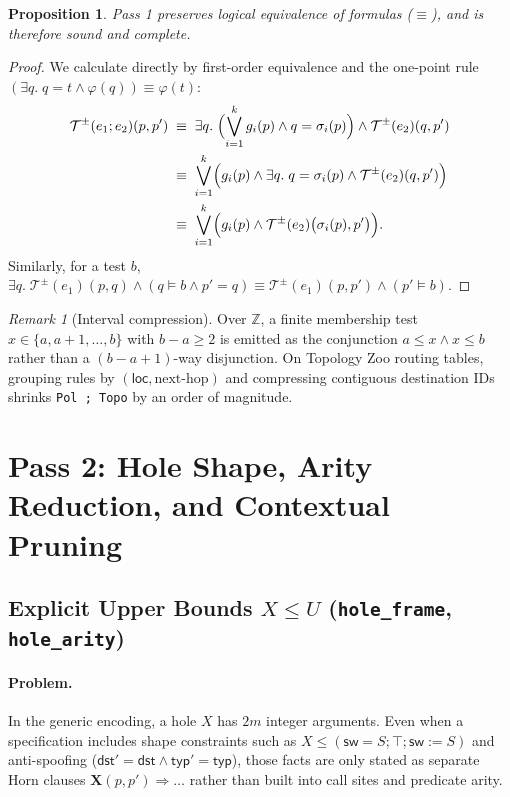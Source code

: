 \documentclass[11pt,a4paper]{article}
\newtheorem{proposition}[theorem]{Proposition}
\theoremstyle{definition}
\theoremstyle{remark}
\newtheorem{remark}[theorem]{Remark}
\begin{document}
\begin{proposition}
Pass 1 preserves logical equivalence of formulas ($\equiv$), and is therefore sound and complete.
\end{proposition}

\begin{proof}
We calculate directly by first-order equivalence and the one-point rule
$(\exists q.\; q = t \land \varphi(q)) \equiv \varphi(t)$:
\begin{align*}
  \mathcal{T}^\pm(e_1 ; e_2)(p, p')
  &\;\equiv\; \exists q.\; \Bigl(\bigvee_{i=1}^k g_i(p) \land q = \sigma_i(p)\Bigr)
              \land \mathcal{T}^\pm(e_2)(q, p') \\
  &\;\equiv\; \bigvee_{i=1}^k \Bigl(g_i(p) \land \exists q.\; q = \sigma_i(p)
              \land \mathcal{T}^\pm(e_2)(q, p')\Bigr) \\
  &\;\equiv\; \bigvee_{i=1}^k \Bigl(g_i(p) \land \mathcal{T}^\pm(e_2)\bigl(\sigma_i(p), p'\bigr)\Bigr).
\end{align*}
Similarly, for a test $b$,
$\exists q.\; \mathcal{T}^\pm(e_1)(p, q) \land (q \models b \land p' = q)
\equiv \mathcal{T}^\pm(e_1)(p, p') \land (p' \models b)$.
\end{proof}

\begin{remark}[Interval compression]
Over $\mathbb{Z}$, a finite membership test $x \in \{a, a+1, \dots, b\}$ with $b - a \ge 2$ is
emitted as the conjunction $a \le x \land x \le b$ rather than a $(b - a + 1)$-way disjunction. On
Topology Zoo routing tables, grouping rules by $(\mathsf{loc}, \text{next-hop})$ and compressing
contiguous destination IDs shrinks \texttt{Pol ; Topo} by an order of magnitude.
\end{remark}

\section{Pass 2: Hole Shape, Arity Reduction, and Contextual Pruning}

\subsection{Explicit Upper Bounds $X \le U$ (\texttt{hole\_frame}, \texttt{hole\_arity})}

\paragraph{Problem.}
In the generic encoding, a hole $X$ has $2m$ integer arguments. Even when a specification includes
shape constraints such as $X \le (\mathsf{sw} = S ; \top ; \mathsf{sw} := S)$ and anti-spoofing
($\mathsf{dst}' = \mathsf{dst} \land \mathsf{typ}' = \mathsf{typ}$), those facts are only stated as
separate Horn clauses $\mathbf{X}(p, p') \Rightarrow \dots$ rather than built into call sites and
predicate arity.
\end{document}
